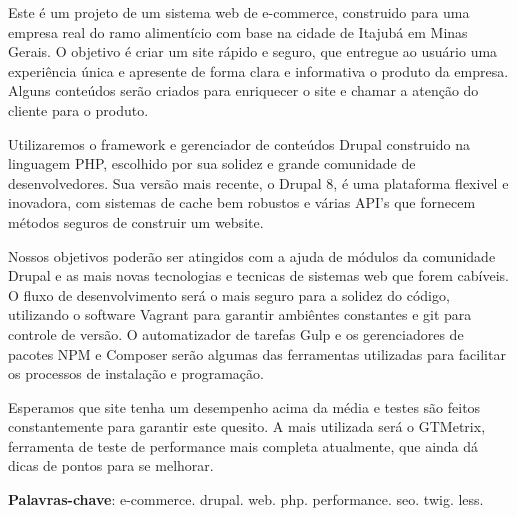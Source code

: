 
Este é um projeto de um sistema web de e-commerce, construido para uma empresa real do ramo alimentício com base na cidade de Itajubá em Minas Gerais. O objetivo é criar um site rápido e seguro, que entregue ao usuário uma experiência única e apresente de forma clara e informativa o produto da empresa. Alguns conteúdos serão criados para enriquecer o site e chamar a atenção do cliente para o produto.

Utilizaremos o framework e gerenciador de conteúdos Drupal construido na linguagem PHP, escolhido por sua solidez e grande comunidade de desenvolvedores. Sua versão mais recente, o Drupal 8, é uma plataforma flexivel e inovadora, com sistemas de cache bem robustos e várias API's que fornecem métodos seguros de construir um website.

Nossos objetivos poderão ser atingidos com a ajuda de módulos da comunidade Drupal e as mais novas tecnologias e tecnicas de sistemas web que forem cabíveis. O fluxo de desenvolvimento será o mais seguro para a solidez do código, utilizando o software Vagrant para garantir ambiêntes constantes e git para controle de versão. O automatizador de tarefas Gulp e os gerenciadores de pacotes NPM e Composer serão algumas das ferramentas utilizadas para facilitar os processos de instalação e programação.

Esperamos que site tenha um desempenho acima da média e testes são feitos constantemente para garantir este quesito. A mais utilizada será o GTMetrix, ferramenta de teste de performance mais completa atualmente, que ainda dá dicas de pontos para  se melhorar.

\textbf{Palavras-chave}: e-commerce. drupal. web. php. performance. seo. twig. less.
